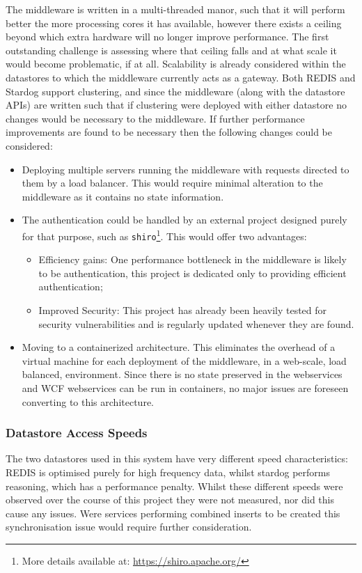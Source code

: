 The middleware is written in a multi-threaded manor, such that it will perform better the more processing cores it has available, however there exists a ceiling beyond which extra hardware will no longer improve performance. The first outstanding challenge is assessing where that ceiling falls and at what scale it would become problematic, if at all. Scalability is already considered within the datastores to which the middleware currently acts as a gateway. Both REDIS and Stardog support clustering, and since the middleware (along with the datastore APIs) are written such that if clustering were deployed with either datastore no changes would be necessary to the middleware. If further performance improvements are found to be necessary then the following changes could be considered:
\begin{itemize}
    \item Deploying multiple servers running the middleware with requests directed to them by a load balancer. This would require minimal alteration to the middleware as it contains no state information. 
    \item The authentication could be handled by an external project designed purely for that purpose, such as \texttt{shiro}\footnote{More details available at: \url{https://shiro.apache.org/}}. This would offer two advantages: 
    \begin{itemize}
        \item Efficiency gains: One performance bottleneck in the middleware is likely to be authentication, this project is dedicated only to providing efficient authentication;
        \item Improved Security: This project has already been heavily tested for security vulnerabilities and is regularly updated whenever they are found.        
    \end{itemize}
    \item Moving to a containerized architecture. This eliminates the overhead of a virtual machine for each deployment of the middleware, in a web-scale, load balanced, environment. Since there is no state preserved in the webservices and WCF webservices can be run in containers, no major issues are foreseen converting to this architecture. 
\end{itemize}

\subsubsection{Datastore Access Speeds}
The two datastores used in this system have very different speed characteristics: REDIS is optimised purely for high frequency data, whilst stardog performs reasoning, which has a performance penalty. Whilst these different speeds were observed over the course of this project they were not measured, nor did this cause any issues. Were services performing combined inserts to be created this synchronisation issue would require further consideration. 
